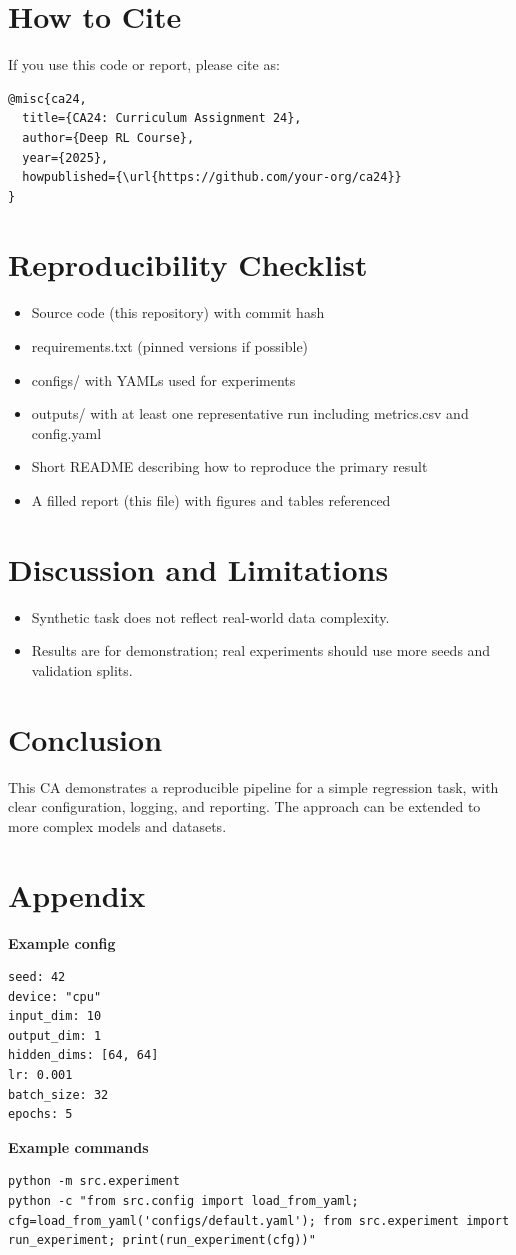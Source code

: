\documentclass[11pt]{article}
\begin{document}
\section*{How to Cite}
If you use this code or report, please cite as:
\begin{verbatim}
@misc{ca24,
  title={CA24: Curriculum Assignment 24},
  author={Deep RL Course},
  year={2025},
  howpublished={\url{https://github.com/your-org/ca24}}
}
\end{verbatim}

\section*{Reproducibility Checklist}
\begin{itemize}
  \item Source code (this repository) with commit hash
  \item requirements.txt (pinned versions if possible)
  \item configs/ with YAMLs used for experiments
  \item outputs/ with at least one representative run including metrics.csv and config.yaml
  \item Short README describing how to reproduce the primary result
  \item A filled report (this file) with figures and tables referenced
\end{itemize}

\section*{Discussion and Limitations}
\begin{itemize}
  \item Synthetic task does not reflect real-world data complexity.
  \item Results are for demonstration; real experiments should use more seeds and validation splits.
\end{itemize}

\section*{Conclusion}
This CA demonstrates a reproducible pipeline for a simple regression task, with clear configuration, logging, and reporting. The approach can be extended to more complex models and datasets.

\section*{Appendix}
\textbf{Example config}
\begin{verbatim}
seed: 42
device: "cpu"
input_dim: 10
output_dim: 1
hidden_dims: [64, 64]
lr: 0.001
batch_size: 32
epochs: 5
\end{verbatim}
\textbf{Example commands}
\begin{verbatim}
python -m src.experiment
python -c "from src.config import load_from_yaml; cfg=load_from_yaml('configs/default.yaml'); from src.experiment import run_experiment; print(run_experiment(cfg))"
\end{verbatim}
\end{document}
